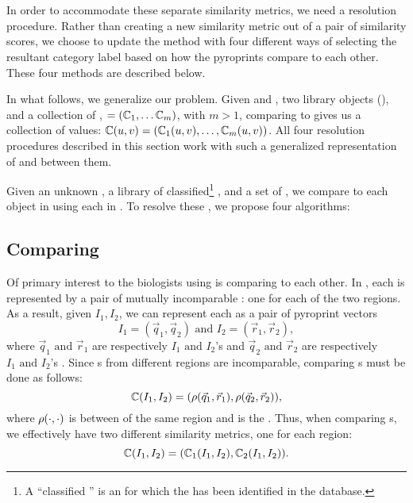\section{\krap{}}\label{sec:krap}

In order to accommodate these separate similarity metrics, we need a resolution procedure.
Rather than creating a new similarity metric out of a pair of similarity scores, we choose to update the \kNN{} method with four different ways of selecting the resultant category label based on how the pyroprints compare to each other. 
These four methods are described below.

In what follows, we generalize our problem. Given \UNKNOWN{} and \KNOWN{}, two library objects (\isols{}), and a collection of \compfuncs{}, \COMP{}$=(\mathbb{C}{}_1,\ldots \mathbb{C}{}_m)$, with $m > 1$, comparing \UNKNOWN{} to \KNOWN{} gives us a collection of values:  
$\mathbb{C}{}(u{},v{}) = (\mathbb{C}{}_1(u{},v{}),\ldots,\mathbb{C}{}_m(u{},v{}))$.
All four resolution procedures described in this section work with such a generalized representation of \isols{} and \compfuncs{} between them.

Given an unknown \isol{} \UNKNOWN{}, a library of classified\footnote{A ``classified \isol{}'' is an \isol{} for which the \spec{} has been identified in the database.} \isols{} \LIB{}, and a set of \compfuncs{} \COMP{}, we compare \UNKNOWN{} to each object in \LIB{} using each \compfunc{} in \COMP{}. To resolve these \compfuncs{}, we propose four algorithms:

\subsection{Comparing \Isols{}}
Of primary interest to the biologists using \cplop{} is comparing \isols{} to each other. In \cplop{}, each \isol{} is represented by a pair of mutually incomparable \pyros{}: one for each of the two \itsshort{} regions.
As a result, given \isols{} $I_1, I_2$, we can represent each as a pair of pyroprint vectors 
\[I_1 = (\vec{q}_1, \vec{q}_2) \text{ and } I_2 = (\vec{r}_1, \vec{r}_2),
\]
where $\vec{q}_1 \text{ and } \vec{r}_1$ are respectively $I_1 \text{ and } I_2$'s \Ssixt{} \pyro{} and $\vec{q}_2 \text{ and } \vec{r}_2$ are respectively $I_1 \text{ and } I_2$'s \Sfive{} \pyro{} \cite{Black2014121}. Since \pyro{}s from different regions are incomparable, comparing \isol{}s must be done as follows:
\[
\mathbb{C}{}(I_1, I_2) = (\rho(\vec{q}_1, \vec{r}_1), \rho(\vec{q}_2, \vec{r}_2)),
\]
where $\rho(\cdot,\cdot)$ is between \pyros{} of the same \itsshort{} region and is the \pearson{}. Thus, when comparing \isol{}s, we effectively have two different similarity metrics, one for each \itsshort{} region:
\[
\mathbb{C}{}(I_1, I_2) = (\mathbb{C}_{1}{}(I_1, I_2), \mathbb{C}_{2}{}(I_1, I_2)).
\]

